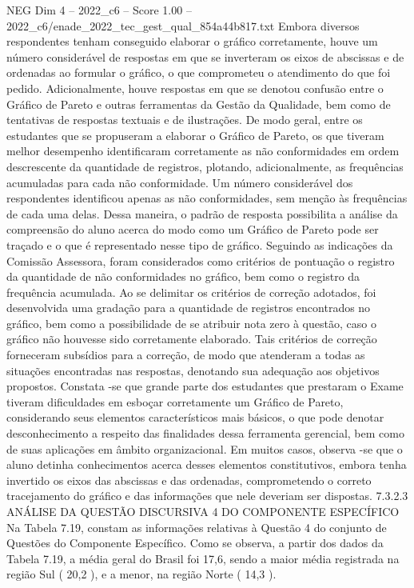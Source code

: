 \begin{textsample}{NEG Dim 4 – 2022\_c6 – Score 1.00 – 2022\_c6/enade\_2022\_tec\_gest\_qual\_854a44b817.txt}
Embora diversos respondentes tenham conseguido elaborar o gráfico corretamente, houve um número considerável de respostas em que se inverteram os eixos de abscissas e de ordenadas ao formular o gráfico, o que comprometeu o atendimento do que foi pedido.
Adicionalmente, houve respostas em que se denotou confusão entre o Gráfico de Pareto e outras ferramentas da Gestão da Qualidade, bem como de tentativas de respostas textuais e de ilustrações.
De modo geral, entre os estudantes que se propuseram a elaborar o Gráfico de Pareto, os que tiveram melhor desempenho identificaram corretamente as não conformidades em ordem descrescente da quantidade de registros, plotando, adicionalmente, as frequências acumuladas para cada não conformidade.
Um número considerável dos respondentes identificou apenas as não conformidades, sem menção às frequências de cada uma delas.
Dessa maneira, o padrão de resposta possibilita a análise da compreensão do aluno acerca do modo como um Gráfico de Pareto pode ser traçado e o que é representado nesse tipo de gráfico.
Seguindo as indicações da Comissão Assessora, foram considerados como critérios de pontuação o registro da quantidade de não conformidades no gráfico, bem como o registro da frequência acumulada.
Ao se delimitar os critérios de correção adotados, foi desenvolvida uma gradação para a quantidade de registros encontrados no gráfico, bem como a possibilidade de se atribuir nota zero à questão, caso o gráfico não houvesse sido corretamente elaborado.
Tais critérios de correção forneceram subsídios para a correção, de modo que atenderam a todas as situações encontradas nas respostas, denotando sua adequação aos objetivos propostos.
Constata -se que grande parte dos estudantes que prestaram o Exame tiveram dificuldades em esboçar corretamente um Gráfico de Pareto, considerando seus elementos característicos mais básicos, o que pode denotar desconhecimento a respeito das finalidades dessa ferramenta gerencial, bem como de suas aplicações em âmbito organizacional.
Em muitos casos, observa -se que o aluno detinha conhecimentos acerca desses elementos constitutivos, embora tenha invertido os eixos das abscissas e das ordenadas, comprometendo o correto tracejamento do gráfico e das informações que nele deveriam ser dispostas. 7.3.2.3 ANÁLISE DA QUESTÃO DISCURSIVA 4 DO COMPONENTE ESPECÍFICO Na Tabela 7.19, constam as informações relativas à Questão 4 do conjunto de Questões do Componente Específico.
Como se observa, a partir dos dados da Tabela 7.19, a média geral do Brasil foi 17,6, sendo a maior média registrada na região Sul ( 20,2 ), e a menor, na região Norte ( 14,3 ).

\end{textsample}
